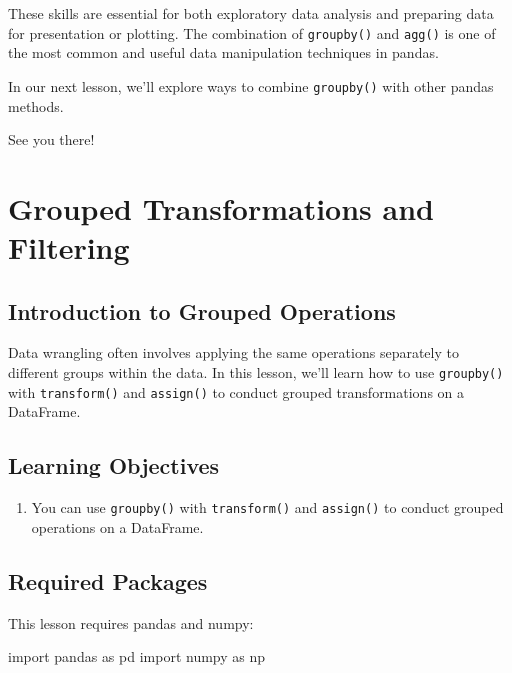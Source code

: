 \documentclass[
  letterpaper,
  DIV=11,
  numbers=noendperiod]{scrreprt}
\newenvironment{Shaded}{\begin{snugshade}}{\end{snugshade}}
\newcommand{\ImportTok}[1]{\textcolor[rgb]{0.00,0.46,0.62}{#1}}
\newcommand{\NormalTok}[1]{\textcolor[rgb]{0.00,0.23,0.31}{#1}}
\providecommand{\tightlist}{%
  \setlength{\itemsep}{0pt}\setlength{\parskip}{0pt}}\usepackage{longtable,booktabs,array}
\begin{document}
These skills are essential for both exploratory data analysis and
preparing data for presentation or plotting. The combination of
\texttt{groupby()} and \texttt{agg()} is one of the most common and
useful data manipulation techniques in pandas.

In our next lesson, we'll explore ways to combine \texttt{groupby()}
with other pandas methods.

See you there!

\chapter{Grouped Transformations and
Filtering}\label{grouped-transformations-and-filtering}

\section{Introduction to Grouped
Operations}\label{introduction-to-grouped-operations}

Data wrangling often involves applying the same operations separately to
different groups within the data. In this lesson, we'll learn how to use
\texttt{groupby()} with \texttt{transform()} and \texttt{assign()} to
conduct grouped transformations on a DataFrame.

\section{Learning Objectives}\label{learning-objectives-11}

\begin{enumerate}
\def\labelenumi{\arabic{enumi}.}
\tightlist
\item
  You can use \texttt{groupby()} with \texttt{transform()} and
  \texttt{assign()} to conduct grouped operations on a DataFrame.
\end{enumerate}

\section{Required Packages}\label{required-packages}

This lesson requires pandas and numpy:

\begin{Shaded}
\begin{Highlighting}[]
\ImportTok{import}\NormalTok{ pandas }\ImportTok{as}\NormalTok{ pd}
\ImportTok{import}\NormalTok{ numpy }\ImportTok{as}\NormalTok{ np}
\end{Highlighting}
\end{Shaded}
\end{document}
